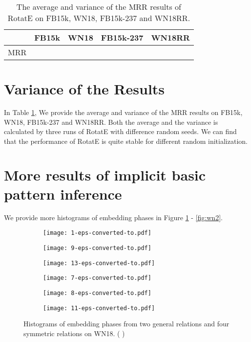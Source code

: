 \documentclass{article} \usepackage{iclr2019_conference,times}
\begin{document}
\begin{table}[t]
\centering
\small
\begin{tabular}{|c|c|c|c|c|}
\hline
& FB15k & WN18 & FB15k-237 & WN18RR \\
\hline
MRR &  &  &  & \\
\hline
\end{tabular}
\caption{The average and variance of the MRR results of RotatE on FB15k, WN18, FB15k-237 and WN18RR.}
\label{tab:var}
\end{table}

\section{Variance of the Results}

In Table \ref{tab:var}, We provide the average and variance of the MRR results on FB15k, WN18, FB15k-237 and WN18RR. Both the average and the variance is calculated by three runs of RotatE with difference random seeds. We can find that the performance of RotatE is quite stable for different random initialization.

\section{More results of implicit basic pattern inference}

We provide more histograms of embedding phases in Figure \ref{fig:wn1} - \ref{fig:wn2}.

\newpage

\begin{figure}[t]
\centering
\begin{subfigure}{0.45\textwidth}
  \centering
  \texttt{[image: 1-eps-converted-to.pdf]}
  \caption{}
\end{subfigure}\begin{subfigure}{0.45\textwidth}
  \centering
  \texttt{[image: 9-eps-converted-to.pdf]}
  \caption{}
\end{subfigure}
\begin{subfigure}{0.45\textwidth}
  \centering
  \texttt{[image: 13-eps-converted-to.pdf]}
  \caption{}
\end{subfigure}
\begin{subfigure}{0.45\textwidth}
  \centering
  \texttt{[image: 7-eps-converted-to.pdf]}
  \caption{}
\end{subfigure}
\begin{subfigure}{0.45\textwidth}
  \centering
  \texttt{[image: 8-eps-converted-to.pdf]}
  \caption{}
\end{subfigure}
\begin{subfigure}{0.45\textwidth}
  \centering
  \texttt{[image: 11-eps-converted-to.pdf]}
  \caption{}
\end{subfigure}
\caption{Histograms of embedding phases from two general relations and four symmetric relations on WN18. (  )}
\label{fig:wn1}
\end{figure}
\end{document}
